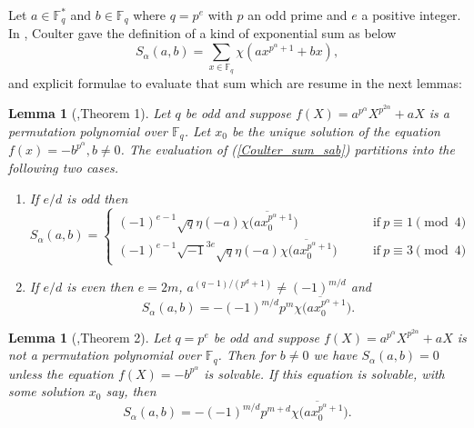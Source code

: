 \documentclass[final,1p,times]{elsarticle}
\newtheorem{sec3_lemma1}[sec3_lemma1x]{Lemma}
\newtheorem{sec3_lemma2}[sec3_lemma1x]{Lemma}
\begin{document}
  Let $ a\in \mathbb{F}_{q}^{*} $ and $ b\in  \mathbb{F}_{q} $ where $ q=p^{e} $ with $ p $ an odd prime and $ e $ a positive integer. In \cite{Bib10}, Coulter gave the definition of a kind of exponential sum as below
  \begin{equation}\label{Coulter_sum_sab}
  S_{\alpha}(a,b)=\sum_{x\in\mathbb{F}_{q}}\chi(ax^{p^{\alpha}+1}+bx),
  \end{equation}
  and explicit formulae to evaluate that sum which are resume in the next  lemmas:
  \begin{sec3_lemma1}[\cite{Bib10},Theorem 1]\label{s3_lemma1}
  Let $ q $ be odd and suppose $ f(X)=a^{p^{\alpha}}X^{p^{2\alpha}} +aX$ is a permutation polynomial over $ \mathbb{F}_{q} $. Let $ x_{0} $ be the unique solution of the equation $ f(x)=- b^{p^{\alpha}},b\ne 0$. The evaluation of (\ref{Coulter_sum_sab}) partitions into the following two cases.
  \begin{enumerate}[(1)]
  \item If $ e/d  $ is odd then
  \begin{equation*}
   S_{\alpha}(a,b)=
   \begin{cases}
   (-1)^{e-1}\sqrt{q}\eta(-a)\overline{\chi(ax_{0}^{p^{\alpha}+1}})&\qquad\text{if}\ p\equiv 1\pmod 4\\
   (-1)^{e-1}\sqrt{-1}^{3e}\sqrt{q}\eta(-a)\overline{\chi(ax_{0}^{p^{\alpha}+1}})&\qquad\text{if}\ p\equiv 3\pmod 4
    \end{cases}
  \end{equation*}
   \item If $ e/d  $ is even then $ e=2m $, $ a^{(q-1)/(p^{d}+1)}\ne (-1)^{m/d} $ and
     \begin{equation*}
     S_{\alpha}(a,b)=-(-1)^{m/d}p^{m}\overline{\chi(ax_{0}^{p^{\alpha}+1}}).
     \end{equation*}
  \end{enumerate}
  \end{sec3_lemma1} 
  \begin{sec3_lemma2}[\cite{Bib10},Theorem 2]\label{s3_lemma2}
  Let $ q=p^{e} $ be odd and suppose $ f(X)=a^{p^{\alpha}}X^{p^{2\alpha}} +aX$ is not a permutation polynomial over $ \mathbb{F}_{q} $. Then for $ b\ne 0 $ we have $ S_{\alpha}(a,b)=0 $ unless the equation $ f(X)=- b^{p^{\alpha}}$ is solvable. If this equation is solvable, with some solution $ x_{0} $ say, then
  \begin{equation*}
  S_{\alpha}(a,b)=-(-1)^{m/d}p^{m+d}\overline{\chi(ax_{0}^{p^{\alpha}+1}}).
  \end{equation*}
  \end{sec3_lemma2}
  
\end{document}
